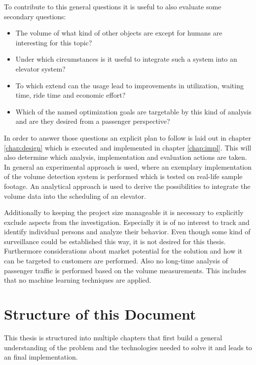 To contribute to this general questions it is useful to also evaluate some secondary questions:

\begin{itemize}
    \item The volume of what kind of other objects are except for humans are interesting for this topic?
    \item Under which circumstances is it useful to integrate such a system into an elevator system?
    \item To which extend can the usage lead to improvements in utilization, waiting time, ride time and economic effort?
    \item Which of the named optimization goals are targetable by this kind of analysis and are they desired from a passenger perspective?
\end{itemize}

In order to answer those questions an explicit plan to follow is laid out in chapter \ref{chap:design} which is executed and implemented in chapter \ref{chap:impl}. 
This will also determine which analysis, implementation and evaluation actions are taken. 
In general an experimental approach is used, where an exemplary implementation of the volume detection system is performed which is tested on real-life sample footage. 
An analytical approach is used to derive the possibilities to integrate the volume data into the scheduling of an elevator.

Additionally to keeping the project size manageable it is necessary to explicitly exclude aspects from the  investigation. 
Especially it is of no interest to track and identify individual persons and analyze their behavior. 
Even though some kind of surveillance could be established this way, it is not desired for this thesis.
Furthermore considerations about market potential for the solution and how it can be targeted to customers are performed. 
Also no long-time analysis of passenger traffic is performed based on the volume measurements.
This includes that no machine learning techniques are applied.

\section{Structure of this Document}

This thesis is structured into multiple chapters that first build a general understanding of the problem and the technologies needed to solve it and leads to an final implementation.

